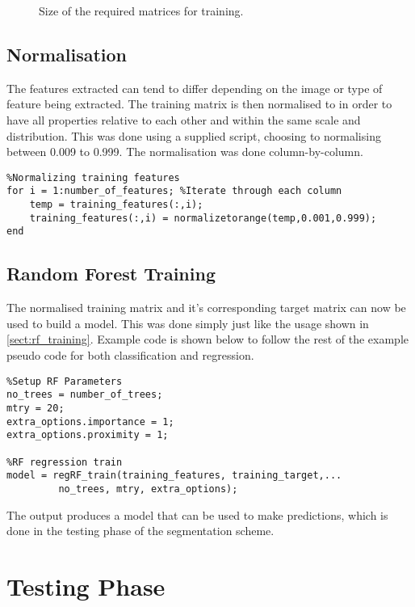 \begin{figure}[H]
    \centering
    \qquad
    \caption{Size of the required matrices for training.}%
    \label{mat:trainmat}
\end{figure}

\subsection{Normalisation}
The features extracted can tend to differ depending on the image or type of feature being extracted.  The training matrix is then normalised to in order to have all properties relative to each other and within the same scale and distribution.  This was done using a supplied script, choosing to normalising between 0.009 to 0.999. The normalisation was done column-by-column.

\begin{lstlisting}
%Normalizing training features 
for i = 1:number_of_features; %Iterate through each column
    temp = training_features(:,i);
    training_features(:,i) = normalizetorange(temp,0.001,0.999);
end
\end{lstlisting}

\subsection{Random Forest Training}
The normalised training matrix and it's corresponding target matrix can now be used to build a model. This was done simply just like the usage shown in \ref{sect:rf_training}. Example code is shown below to follow the rest of the example pseudo code for both classification and regression.

\begin{lstlisting}
%Setup RF Parameters
no_trees = number_of_trees;
mtry = 20;
extra_options.importance = 1;
extra_options.proximity = 1;

%RF regression train
model = regRF_train(training_features, training_target,...
		 no_trees, mtry, extra_options);
\end{lstlisting}
\bigskip
The output produces a model that can be used to make predictions, which is done in the testing phase of the segmentation scheme. 
\section{Testing Phase}
\label{sect: teststage}


